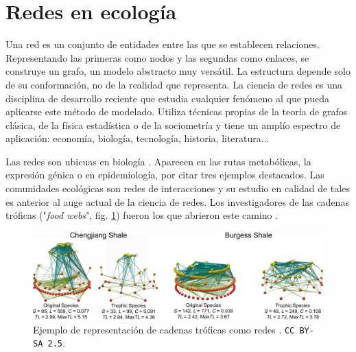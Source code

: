 
\section{Redes en ecología}

Una red es un conjunto de entidades entre las que se establecen relaciones. Representando las primeras como nodos y las segundas como enlaces, 
se construye un grafo, un modelo abstracto muy versátil. La estructura depende solo de su conformación, no de la realidad que representa. La ciencia de redes es una disciplina de desarrollo reciente que estudia cualquier fenómeno al que pueda aplicarse este método de modelado. Utiliza técnicas propias de la teoría de grafos clásica, de la física estadística o de la sociometría y tiene un amplío espectro de aplicación: economía, biología, tecnología, historia, literatura... \cite{barabasi2002linked, newman2003structure, brandes2013network}

Las redes son ubicuas en biología \cite{mason2007graph, raymond2009network}. Aparecen en las rutas metabólicas, la expresión génica o en epidemiología, por citar tres ejemplos destacados. Las comunidades ecológicas son redes de interacciones y su estudio en calidad de tales es anterior al auge actual de la ciencia de redes. Los investigadores de las cadenas tróficas ("\textit{food webs}", fig. \ref{fig:INTRO_Chengjiang_and_Burgess_Shale_1}) fueron los que abrieron este camino \cite{pimm1982food,martinez1992constant}.

\begin{figure}[h!]
\centering
\includegraphics[scale=0.75]{Figures/INTRO_Chengjiang_and_Burgess_Shale_1.png}
\caption{Ejemplo de representación de cadenas tróficas como redes \cite{dunne2008compilation}. \small{\texttt{CC BY-SA 2.5}}.}
\label{fig:INTRO_Chengjiang_and_Burgess_Shale_1}
\end{figure}


